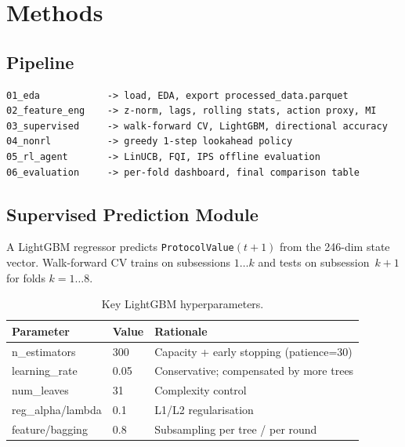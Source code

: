 \documentclass[11pt,a4paper]{article}
\begin{document}
\section{Methods}

\subsection*{Pipeline}

\begin{lstlisting}
01_eda            -> load, EDA, export processed_data.parquet
02_feature_eng    -> z-norm, lags, rolling stats, action proxy, MI
03_supervised     -> walk-forward CV, LightGBM, directional accuracy
04_nonrl          -> greedy 1-step lookahead policy
05_rl_agent       -> LinUCB, FQI, IPS offline evaluation
06_evaluation     -> per-fold dashboard, final comparison table
\end{lstlisting}

\subsection{Supervised Prediction Module}
\label{sec:supervised}

A LightGBM regressor \cite{ke2017} predicts \texttt{ProtocolValue}$(t+1)$ from
the 246-dim state vector. Walk-forward CV trains on subsessions $1\ldots k$ and
tests on subsession~$k+1$ for folds $k = 1\ldots8$.

\begin{table}[H]
\centering\small
\caption{Key LightGBM hyperparameters.}
\begin{tabular}{lll}
\toprule
\textbf{Parameter} & \textbf{Value} & \textbf{Rationale} \\
\midrule
n\_estimators       & 300   & Capacity + early stopping (patience=30) \\
learning\_rate      & 0.05  & Conservative; compensated by more trees \\
num\_leaves         & 31    & Complexity control \\
reg\_alpha/lambda   & 0.1   & L1/L2 regularisation \\
feature/bagging     & 0.8   & Subsampling per tree / per round \\
\bottomrule
\end{tabular}
\end{table}
\end{document}
